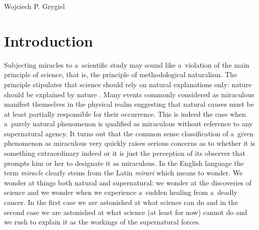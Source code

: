 \begin{artengenv}{Wojciech P. Grygiel}
\section*{Introduction}
\lettrine[loversize=0.13,lines=2,lraise=-0.01,nindent=0em,findent=0.2pt]%
{S}{}ubjecting miracles to a~scientific study may sound like a~violation of the main principle of science, that is, the principle of methodological naturalism. The principle stipulates that science should rely on natural explanations only: nature should be explained by nature
\parencite[e.g.][]{plantinga_methodological_2001}. %
 Many events commonly considered as miraculous manifest themselves in the physical realm suggesting that natural causes must be at least partially responsible for their occurrence. This is indeed the case when a~purely natural phenomenon is qualified as miraculous without reference to any supernatural agency. It turns out that the common sense classification of a~given phenomenon as miraculous very quickly raises serious concerns as to whether it is something extraordinary indeed or it is just the perception of its observer that prompts him or her to designate it as miraculous. In the English language the term \textit{miracle} clearly stems from the Latin \textit{mirari} which means to wonder. We wonder at things both natural and supernatural: we wonder at the discoveries of science and we wonder when we experience a~sudden healing from a~deadly cancer. In the first case we are astonished at what science can do and in the second case we are astonished at what science (at least for now) cannot do and we rush to explain it as the workings of the supernatural forces.


\end{artengenv}
